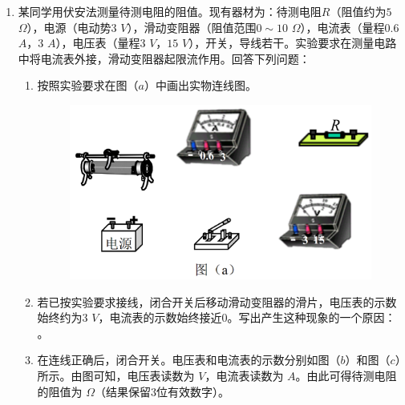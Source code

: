 \begin{enumerate}[leftmargin=0em]
\newpage
\item 
{}
某同学用伏安法测量待测电阻的阻值。现有器材为：待测电阻$ R $（阻值约为$ 5 $ $ \Omega $），电源（电动势$ 3 $ $ V $），滑动变阻器（阻值范围$ 0 \sim 10 $ $ \Omega $），电流表（量程$ 0.6 $ $ A $，$ 3 $ $ A $），电压表（量程$ 3 $ $ V $，$ 15 $ $ V $），开关，导线若干。实验要求在测量电路中将电流表外接，滑动变阻器起限流作用。回答下列问题：
\begin{enumerate}
\renewcommand{\labelenumi}{\arabic{enumi}.}
\item
按照实验要求在图（$ a $）中画出实物连线图。
\begin{figure}[h!]
\centering
\includegraphics[width=0.7\linewidth]{picture/screenshot006}
\end{figure}


\item 
若已按实验要求接线，闭合开关后移动滑动变阻器的滑片，电压表的示数始终约为$ 3 $ $ V $，电流表的示数始终接近$ 0 $。写出产生这种现象的一个原因：  。
\item 
在连线正确后，闭合开关。电压表和电流表的示数分别如图（$ b $）和图（$ c $）所示。由图可知，电压表读数为  $ V $，电流表读数为  $ A $。由此可得待测电阻的阻值为  $ \Omega $（结果保留$ 3 $位有效数字）。
\begin{figure}[h!]
\centering

\end{figure}

\end{enumerate}





\end{enumerate}

